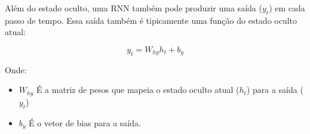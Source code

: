 \documentclass{article}
\begin{document}
Além do estado oculto, uma RNN também pode produzir uma saída ($y_t$) em cada passo de tempo.  Essa saída também é tipicamente uma função do estado oculto atual:

\begin{equation}
    y_t = W_{hy}h_t + b_y
\end{equation}

Onde:
\begin{itemize}
    \item $W_{hy}$ É a matriz de pesos que mapeia o estado oculto atual ($h_t$) para a saída ($y_t$)
    \item $b_y$ É o vetor de bias para a saída.
\end{itemize}
\end{document}
